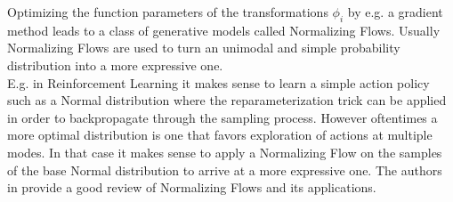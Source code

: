 \documentclass{article}
\begin{document}
Optimizing the function parameters of the transformations $\phi_i$ by e.g. a gradient method leads to a class of generative models called Normalizing Flows. Usually Normalizing Flows are used to turn an unimodal and simple probability distribution into a more expressive one.\\
E.g. in Reinforcement Learning it makes sense to learn a simple action policy such as a Normal distribution where the reparameterization trick can be applied in order to backpropagate through the sampling process. However oftentimes a more optimal distribution is one that favors exploration of actions at multiple modes. In that case it makes sense to apply a Normalizing Flow on the samples of the base Normal distribution to arrive at a more expressive one. The authors in \cite{Kobyzev_2020} provide a good review of Normalizing Flows and its applications.
\end{document}
